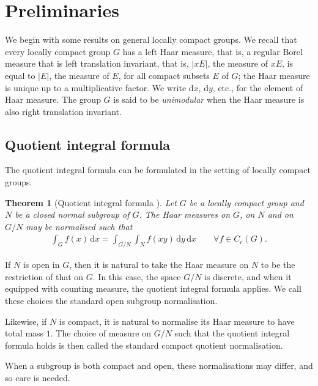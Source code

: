 \documentclass[12pt,twoside,a4paper]{amsart}
\newtheorem{thm}{Theorem}[section]
\theoremstyle{definition}
\theoremstyle{remark}
\numberwithin{equation}{section}
\newcommand{\wrt}[1]{\,\mathrm{d} #1}
\newcommand{\labs}{\left\vert}
\newcommand{\rabs}{\right\vert}
\begin{document}

\section{Preliminaries}\label{sec:2}
We begin with some results on general locally compact groups.
We recall that every locally compact group $G$ has a left Haar measure, that is, a regular Borel measure that is left translation invariant, that is, $\labs xE\rabs $, the measure of $xE$,  is equal to $\labs E\rabs$, the measure of $E$, for all compact subsets $E$ of $G$; the Haar measure is unique up to a multiplicative factor.
We write $\mathrm{d}x$, $\mathrm{d}y$, etc., for the element of Haar measure.
The group $G$ is said to be \emph{unimodular} when the Haar measure is also right translation invariant.

\subsection{Quotient integral formula}
The quotient integral formula can be formulated in the setting of locally compact groups.

\begin{thm}[Quotient integral formula \cite{DE09}]\label{thm:quotient-integral-formula}
Let $G$ be a locally compact group and $N$ be a closed normal subgroup of $G$. 
The Haar measures on $G$, on $N$ and on $G/N$ may be normalised such that \begin{align}\label{eq:quotient-integral-formula}
\int_G f(x) \wrt x =\int_{{G}/{N}}\int_{N}f(xy)\wrt y\wrt x
\qquad\forall f\in C_c(G) .
\end{align}
\end{thm}

If $N$ is open in $G$, then it is natural to take the Haar measure on $N$ to be the restriction of that on $G$.
In this case, the space $G/N$ is discrete, and when it equipped with counting measure, the quotient integral formula applies.  
We call these choices the standard open subgroup normalisation.

Likewise, if $N$ is compact, it is natural to normalise its Haar measure to have total mass  $1$.
The choice of measure on $G/N$ such that the quotient integral formula holds is then called the standard compact quotient normalisation.

When a subgroup is both compact and open, these normalisations may differ, and so care is needed.

\end{document}
